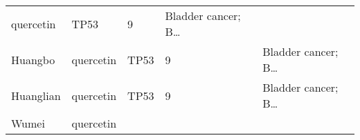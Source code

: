 \documentclass[
]{article}
\begin{document}
\begin{longtable}[]{@{}lllll@{}}
\begin{minipage}[t]{0.16\columnwidth}
quercetin\strut
\end{minipage} & \begin{minipage}[t]{0.12\columnwidth}\raggedright
TP53\strut
\end{minipage} & \begin{minipage}[t]{0.19\columnwidth}\raggedright
9\strut
\end{minipage} & \begin{minipage}[t]{0.21\columnwidth}\raggedright
Bladder cancer; B\ldots{}\strut
\end{minipage}\tabularnewline
\begin{minipage}[t]{0.17\columnwidth}\raggedright
Huangbo\strut
\end{minipage} & \begin{minipage}[t]{0.16\columnwidth}\raggedright
quercetin\strut
\end{minipage} & \begin{minipage}[t]{0.12\columnwidth}\raggedright
TP53\strut
\end{minipage} & \begin{minipage}[t]{0.19\columnwidth}\raggedright
9\strut
\end{minipage} & \begin{minipage}[t]{0.21\columnwidth}\raggedright
Bladder cancer; B\ldots{}\strut
\end{minipage}\tabularnewline
\begin{minipage}[t]{0.17\columnwidth}\raggedright
Huanglian\strut
\end{minipage} & \begin{minipage}[t]{0.16\columnwidth}\raggedright
quercetin\strut
\end{minipage} & \begin{minipage}[t]{0.12\columnwidth}\raggedright
TP53\strut
\end{minipage} & \begin{minipage}[t]{0.19\columnwidth}\raggedright
9\strut
\end{minipage} & \begin{minipage}[t]{0.21\columnwidth}\raggedright
Bladder cancer; B\ldots{}\strut
\end{minipage}\tabularnewline
\begin{minipage}[t]{0.17\columnwidth}\raggedright
Wumei\strut
\end{minipage} & \begin{minipage}[t]{0.16\columnwidth}\raggedright
quercetin\strut
\end{minipage} & \begin{minipage}[t]{0.12\columnwidth}\raggedright

\end{minipage}
\end{longtable}
\end{document}
